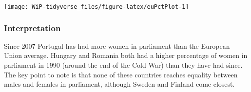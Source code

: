 \documentclass[a4paper,9pt,twocolumn,twoside,]{pinp}
\begin{document}
\begin{Shaded}
\end{Shaded}

\begin{center}\texttt{[image: WiP-tidyverse\_files/figure-latex/euPctPlot-1]} \end{center}

\hypertarget{interpretation-1}{%
\subsubsection{Interpretation}\label{interpretation-1}}

Since 2007 Portugal has had more women in parliament than the European
Union average. Hungary and Romania both had a higher percentage of women
in parliament in 1990 (around the end of the Cold War) than they have
had since. The key point to note is that none of these countries reaches
equality between males and females in parliament, although Sweden and
Finland come closest.
\end{document}
